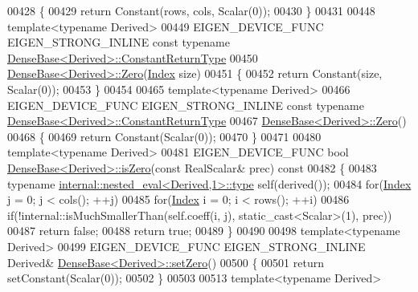 \begin{DoxyCode}
00428 \{
00429   \textcolor{keywordflow}{return} Constant(rows, cols, Scalar(0));
00430 \}
00431 
00448 \textcolor{keyword}{template}<\textcolor{keyword}{typename} Derived>
00449 EIGEN\_DEVICE\_FUNC EIGEN\_STRONG\_INLINE \textcolor{keyword}{const} \textcolor{keyword}{typename} 
      \hyperlink{group___core___module_class_eigen_1_1_cwise_nullary_op}{DenseBase<Derived>::ConstantReturnType}
00450 \hyperlink{group___core___module_a8c4be762b10041d64a2b2ce85bb14ba0}{DenseBase<Derived>::Zero}(\hyperlink{namespace_eigen_a62e77e0933482dafde8fe197d9a2cfde}{Index} size)
00451 \{
00452   \textcolor{keywordflow}{return} Constant(size, Scalar(0));
00453 \}
00454 
00465 \textcolor{keyword}{template}<\textcolor{keyword}{typename} Derived>
00466 EIGEN\_DEVICE\_FUNC EIGEN\_STRONG\_INLINE \textcolor{keyword}{const} \textcolor{keyword}{typename} 
      \hyperlink{group___core___module_class_eigen_1_1_cwise_nullary_op}{DenseBase<Derived>::ConstantReturnType}
00467 \hyperlink{group___core___module_a8c4be762b10041d64a2b2ce85bb14ba0}{DenseBase<Derived>::Zero}()
00468 \{
00469   \textcolor{keywordflow}{return} Constant(Scalar(0));
00470 \}
00471 
00480 \textcolor{keyword}{template}<\textcolor{keyword}{typename} Derived>
00481 EIGEN\_DEVICE\_FUNC \textcolor{keywordtype}{bool} \hyperlink{group___core___module_aad9b1b1368b249e0e0f14b7f2960fb58}{DenseBase<Derived>::isZero}(\textcolor{keyword}{const} RealScalar& prec)\textcolor{keyword}{ const}
00482 \textcolor{keyword}{}\{
00483   \textcolor{keyword}{typename} \hyperlink{class_eigen_1_1internal_1_1_tensor_lazy_evaluator_writable}{internal::nested\_eval<Derived,1>::type} \textcolor{keyword}{self}(derived());
00484   \textcolor{keywordflow}{for}(\hyperlink{namespace_eigen_a62e77e0933482dafde8fe197d9a2cfde}{Index} j = 0; j < cols(); ++j)
00485     \textcolor{keywordflow}{for}(\hyperlink{namespace_eigen_a62e77e0933482dafde8fe197d9a2cfde}{Index} i = 0; i < rows(); ++i)
00486       \textcolor{keywordflow}{if}(!internal::isMuchSmallerThan(\textcolor{keyword}{self}.coeff(i, j), static\_cast<Scalar>(1), prec))
00487         \textcolor{keywordflow}{return} \textcolor{keyword}{false};
00488   \textcolor{keywordflow}{return} \textcolor{keyword}{true};
00489 \}
00490 
00498 \textcolor{keyword}{template}<\textcolor{keyword}{typename} Derived>
00499 EIGEN\_DEVICE\_FUNC EIGEN\_STRONG\_INLINE Derived& \hyperlink{group___core___module_ac74411ddeea2545bf20baf14613be47e}{DenseBase<Derived>::setZero}()
00500 \{
00501   \textcolor{keywordflow}{return} setConstant(Scalar(0));
00502 \}
00503 
00513 \textcolor{keyword}{template}<\textcolor{keyword}{typename} Derived>

\end{DoxyCode}
